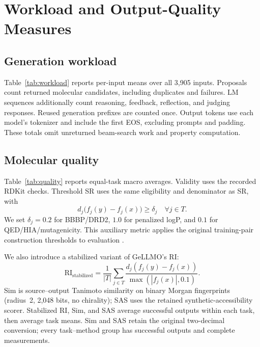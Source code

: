 \section{Workload and Output-Quality Measures}
\label{sec:metrics}
\subsection{Generation workload}
Table~\ref{tab:workload} reports per-input means over all 3,905 inputs. Proposals count returned molecular candidates, including duplicates and failures. LM sequences additionally count reasoning, feedback, reflection, and judging responses. Reused generation prefixes are counted once. Output tokens use each model's tokenizer and include the first EOS, excluding prompts and padding. These totals omit unreturned beam-search work and property computation.

\subsection{Molecular quality}
Table~\ref{tab:quality} reports equal-task macro averages. Validity uses the recorded RDKit checks. Threshold SR uses the same eligibility and denominator as SR, with
\begin{equation}
 d_j\bigl(f_j(y)-f_j(x)\bigr)\geq\delta_j \quad\forall j\in T.
\end{equation}
We set $\delta_j=0.2$ for BBBP/DRD2, $1.0$ for penalized logP, and $0.1$ for QED/HIA/mutagenicity. This auxiliary metric applies the original training-pair construction thresholds to evaluation \citep{gellmo2025}.

We also introduce a stabilized variant of GeLLMO's RI:
\begin{equation}
 \mathrm{RI}_{\mathrm{stabilized}}=\frac{1}{|T|}\sum_{j\in T}
 \frac{d_j(f_j(y)-f_j(x))}{\max(|f_j(x)|,0.1)}.
\end{equation}
Sim is source--output Tanimoto similarity on binary Morgan fingerprints (radius~2, 2,048 bits, no chirality); SAS uses the retained synthetic-accessibility scorer. Stabilized RI, Sim, and SAS average successful outputs within each task, then average task means. Sim and SAS retain the original two-decimal conversion; every task--method group has successful outputs and complete measurements.
